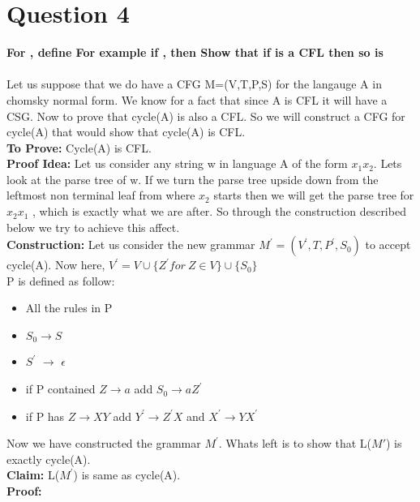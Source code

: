 \documentclass{article}
\begin{document}
\pagebreak


\section{Question 4}
\textbf{For , define 
For example if , then 
Show that if  is a CFL then so is } \\
\\
Let us suppose that we do have a CFG M=(V,T,P,S) for the langauge A in chomsky normal form. We know for a fact that since A is CFL it will have a CSG. Now to prove that cycle(A) is also a CFL. So we will construct a CFG for cycle(A) that would show that cycle(A) is CFL. \\
\textbf{To Prove:} Cycle(A) is CFL.\\
\textbf{Proof Idea:} Let us consider any string w in language A of the form $x_1 x_2$. Lets look at the parse tree of w. If we turn the parse tree upside down from the leftmost non terminal leaf from where $x_2$ starts then we will get the parse tree for $x_2 x_1$ , which is exactly what we are after. So through the construction described below we try to achieve this affect.\\
\textbf{Construction:} Let us consider the new grammar $M^{'} = (V^{'},T,P^{'},S_0)$ to accept cycle(A). Now here, $ V^{'} = V \cup \{ Z^{'} for \ Z \in V \} \cup \{ S_0\}$\\ P is defined as follow: 
\begin{itemize}
    \item All the rules in P
    \item $S_0 \rightarrow S$
    \item $S^{'}$ $\rightarrow$ $\epsilon$
    \item if  P  contained $ Z \rightarrow a$ add $S_0 \rightarrow aZ^{'}$
    \item if P has $Z \rightarrow XY$ add $Y^{'} \rightarrow Z^{'}X$  and $X^{'} \rightarrow YX^{'}$
\end{itemize}
Now we have constructed the grammar $M^{'}$. Whats left is to show that L($M{'}$) is exactly cycle(A). \\
\textbf{Claim:} L($M^{'}$) is same as cycle(A). \\
\textbf{Proof:} 

\pagebreak
\end{document}
